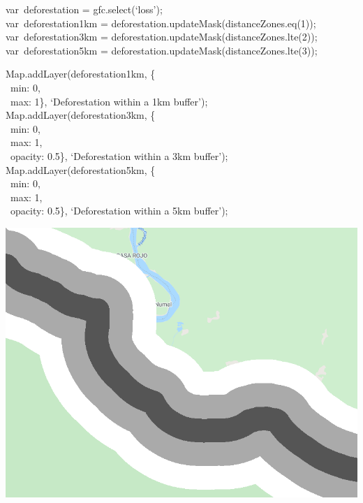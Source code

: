 \documentclass[
  letterpaper,
  DIV=11,
  numbers=noendperiod]{scrreprt}
\begin{document}
var~deforestation = gfc.select(`loss');\\
var~deforestation1km = deforestation.updateMask(distanceZones.eq(1));\\
var~deforestation3km = deforestation.updateMask(distanceZones.lte(2));\\
var~deforestation5km = deforestation.updateMask(distanceZones.lte(3));

Map.addLayer(deforestation1km, \{\\
\hspace*{0.333em} ~min: 0,\\
\hspace*{0.333em} ~max: 1\}, `Deforestation within a 1km buffer');\\
Map.addLayer(deforestation3km, \{\\
\hspace*{0.333em} ~min: 0,\\
\hspace*{0.333em} ~max: 1,\\
\hspace*{0.333em} ~opacity: 0.5\}, `Deforestation within a 3km
buffer');\\
Map.addLayer(deforestation5km, \{\\
\hspace*{0.333em} ~min: 0,\\
\hspace*{0.333em} ~max: 1,\\
\hspace*{0.333em} ~opacity: 0.5\}, `Deforestation within a 5km buffer');

\includegraphics{./F5/image22.png}
\end{document}
